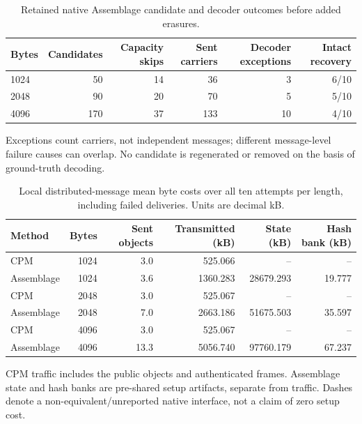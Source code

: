 \documentclass[journal]{IEEEtran}
\renewcommand{\arraystretch}{1.2}
\renewcommand{\arraystretch}{1.0}
\theoremstyle{definition}
\theoremstyle{game}
\renewcommand{\arraystretch}{1.5}
\begin{document}
\begin{table}[!t]
\centering\small
\caption{Retained native Assemblage candidate and decoder outcomes before added erasures.}
\label{tab:native-failures}
\setlength{\tabcolsep}{4pt}\renewcommand{\arraystretch}{1.12}
\begin{tabular}{lrrrrr}
\toprule
Bytes & Candidates & Capacity skips & Sent carriers & Decoder exceptions & Intact recovery\\
\midrule
1024 & 50 & 14 & 36 & 3 & 6/10\\
2048 & 90 & 20 & 70 & 5 & 5/10\\
4096 & 170 & 37 & 133 & 10 & 4/10\\
\bottomrule
\end{tabular}
\par\smallskip\parbox{.97\textwidth}{\footnotesize Exceptions count carriers, not independent messages; different message-level failure causes can overlap. No candidate is regenerated or removed on the basis of ground-truth decoding.}
\end{table}

\begin{table}[!t]
\centering\small
\caption{Local distributed-message mean byte costs over all ten attempts per length, including failed deliveries. Units are decimal kB.}
\label{tab:native-system-cost}
\setlength{\tabcolsep}{4pt}\renewcommand{\arraystretch}{1.12}
\begin{tabular}{lrrrrr}
\toprule
Method & Bytes & Sent objects & Transmitted (kB) & State (kB) & Hash bank (kB)\\
\midrule
CPM & 1024 & 3.0 & 525.066 & -- & --\\
Assemblage & 1024 & 3.6 & 1360.283 & 28679.293 & 19.777\\
CPM & 2048 & 3.0 & 525.067 & -- & --\\
Assemblage & 2048 & 7.0 & 2663.186 & 51675.503 & 35.597\\
CPM & 4096 & 3.0 & 525.067 & -- & --\\
Assemblage & 4096 & 13.3 & 5056.740 & 97760.179 & 67.237\\
\bottomrule
\end{tabular}
\par\smallskip\parbox{.97\textwidth}{\footnotesize CPM traffic includes the public objects and authenticated frames. Assemblage state and hash banks are pre-shared setup artifacts, separate from traffic. Dashes denote a non-equivalent/unreported native interface, not a claim of zero setup cost.}
\end{table}
\end{document}
